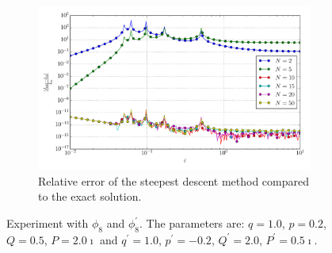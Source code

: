 \documentclass[a4paper,10pt]{article}
\begin{document}
\begin{figure}[ht!]
\begin{subfigure}[t]{0.5\linewidth}
    \includegraphics[width=\linewidth]{./plots/tp_1d_conv_eps_8_8_err_rel_nsd.pdf}
    \caption{Relative error of the steepest descent method compared to the exact solution.}
    \label{fig:tp_1d_conv_eps_8_8_err_nsd}
  \end{subfigure}
  \label{fig:tp_1d_conv_eps_8_8}
  \caption{Experiment with $\phi_{8}$ and $\phi_{8}^{\prime}$.
  The parameters are:
  $q=1.0$, $p=0.2$, $Q=0.5$, $P=2.0\imath$ and
  $q^\prime=1.0$, $p^\prime=-0.2$, $Q^\prime=2.0$, $P^\prime=0.5\imath$.}
\end{figure}
\end{document}
